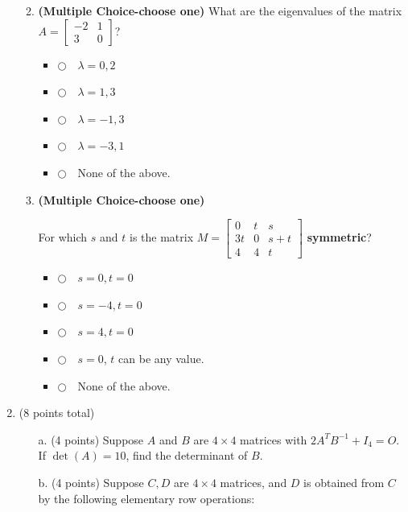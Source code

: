 \documentclass[12pt]{extarticle}
\newcommand{\chooseone}{{\Large$\Circle$\ \ }}
\begin{document}
\begin{enumerate}
\begin{enumerate}[label=\alph*.]
\vspace{2cm}


\item \textbf{(Multiple Choice-choose one)} What are the eigenvalues of the matrix $A=\begin{bmatrix} -2 & 1 \\ 3 & 0\end{bmatrix}$?
\begin{itemize}[label={}]
\item \chooseone $\lambda=0,2$
\item \chooseone $\lambda=1,3$
\item \chooseone $\lambda=-1,3$
\item \chooseone $\lambda=-3,1$
\item \chooseone None of the above.
\end{itemize}
\vspace{2cm}


\item \textbf{(Multiple Choice-choose one)} 

For which $s$ and $t$ is the matrix $M=\begin{bmatrix} 0 & t & s\\ 3t & 0 & s+t \\ 4 & 4 & t\end{bmatrix} $ 
\textbf{symmetric}?
\begin{itemize}[label={}]
\item \chooseone $s=0, t=0$
\item \chooseone $s=-4, t=0$
\item \chooseone $s=4, t=0$
\item \chooseone $s=0$, $t$ can be any value.
\item \chooseone None of the above.
\end{itemize}

\end{enumerate}




\newpage

\item (8 points total)
\begin{itemize}
  \item[a.](4 points) Suppose $A$ and $B$ are $4\times 4$ matrices with $2A^TB^{-1}+I_4=O$. If $\det(A)=10$, find the determinant of $B$.

\vspace{3in}

\item[b.] (4 points) Suppose $C,D$ are $4\times 4$ matrices, and $D$ is obtained from $C$ by the following elementary row operations:


\end{itemize}
\end{enumerate}
\end{document}
